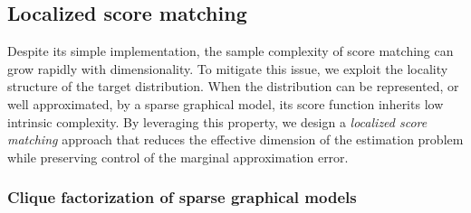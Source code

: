 \documentclass[11pt]{article}
\begin{document}
\subsection{Localized score matching}
\label{sec:LSM_method}

Despite its simple implementation, the sample complexity of score matching can grow rapidly with dimensionality. 
%
To mitigate this issue, we exploit the locality structure of the target distribution.
When the distribution can be represented, or well approximated, by a sparse graphical model, its score function inherits low intrinsic complexity.
By leveraging this property, we design a \emph{localized score matching} approach that reduces the effective dimension of the estimation problem while preserving control of the marginal approximation error.




\subsubsection{Clique factorization of sparse graphical models}
\label{sec:LSM_clique}
\end{document}
